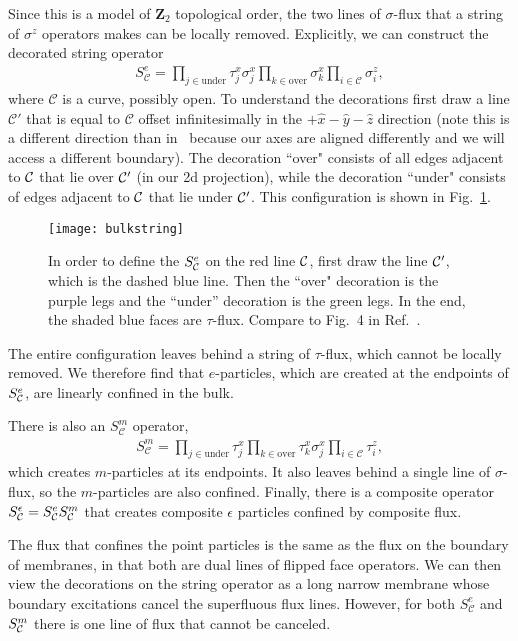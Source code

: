 Since this is a model of $\mathbf{Z}_2$ topological order, the two lines of $\sigma$-flux that a string of $\sigma^z$ operators makes can be locally removed. Explicitly, we can construct the decorated string operator
\begin{align}
S^e_\mathcal{C} = \prod_{j\in\text{under}} \tau^x_j \sigma^x_j \prod_{k\in\text{over}} \sigma^x_k \prod_{i\in\mathcal{C}}\sigma^z_i,
\end{align}
where $\mathcal{C}$ is a curve, possibly open. To understand the decorations first draw a line $\mathcal{C}'$ that is equal to $\mathcal{C}$ offset infinitesimally in the $+\hat{x}-\hat{y}-\hat{z}$ direction (note this is a different direction than in~\cite{Burnell2014Soluble} because our axes are aligned differently and we will access a different boundary). The decoration ``over" consists of all edges adjacent to $\mathcal{C}$ that lie over $\mathcal{C}'$ (in our 2d projection), while the decoration ``under" consists of edges adjacent to $\mathcal{C}$ that lie under $\mathcal{C}'$. This configuration is shown in Fig.~\ref{fig:bulkstring}. 
\begin{figure}
\centering
\texttt{[image: bulkstring]}
\caption[Confined anyon string in the bulk of the Walker-Wang model]{In order to define the $S_{\mathcal{C}}^e$ on the red line $\mathcal{C}$, first draw the line $\mathcal{C}'$, which is the dashed blue line. Then the ``over" decoration is the purple legs and the ``under'' decoration is the green legs. In the end, the shaded blue faces are $\tau$-flux. Compare to Fig.~4 in Ref.~\cite{Burnell2014Soluble}.}
\label{fig:bulkstring}
\end{figure}

The entire configuration leaves behind a string of $\tau$-flux, which cannot be locally removed. We therefore find that $e$-particles, which are created at the endpoints of $S^e_{\mathcal{C}}$, are linearly confined in the bulk.

There is also an $S^m_\mathcal{C}$ operator,
\begin{align}
S^m_\mathcal{C} = \prod_{j\in\text{under}} \tau^x_j  \prod_{k\in\text{over}} \tau^x_k \sigma^x_j \prod_{i\in\mathcal{C}}\tau^z_i,
\end{align}
which creates $m$-particles at its endpoints. It also leaves behind a single line of $\sigma$-flux, so the $m$-particles are also confined. Finally, there is a composite operator $S^\epsilon_{\mathcal{C}}=S^e_{\mathcal{C}} S^m_{\mathcal{C}}$ that creates composite $\epsilon$ particles confined by composite flux.
	
The flux that confines the point particles is the same as the flux on the boundary of membranes, in that both are dual lines of flipped face operators. We can then view the decorations on the string operator as a long narrow membrane whose boundary excitations cancel the superfluous flux lines. However, for both $S^e_\mathcal{C}$ and $S^m_{\mathcal{C}}$ there is one line of flux that cannot be canceled.

